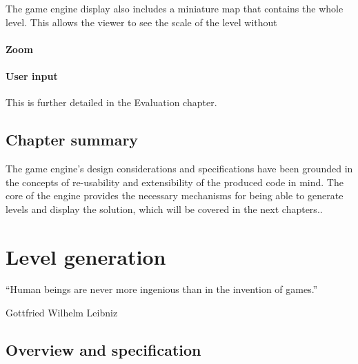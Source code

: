 \documentclass[11pt, a4paper, oneside]{report} %
\begin{document}
The game engine display also includes a miniature map that contains the whole
level. This allows the viewer to see the scale of the level without

\subsubsection{Zoom}

\subsubsection{User input}

This is further detailed in the Evaluation chapter.




\section{Chapter summary}

The game engine's design considerations and specifications have been grounded in
the concepts of re-usability and extensibility of the produced code in mind. The
core of the engine provides the necessary mechanisms for being able to generate
levels and display the solution, which will be covered in the next chapters..



\chapter{Level generation}

\epigraph{``Human beings are never more ingenious than in the invention of
games.''}{Gottfried Wilhelm Leibniz}

\section{Overview and specification}
\end{document}
